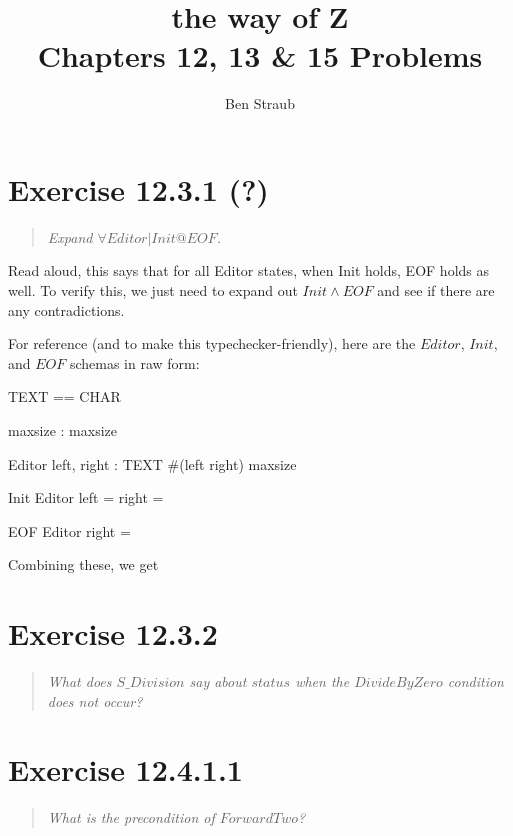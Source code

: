 \documentclass[10pt]{article}
\begin{document}
\title{the way of Z \\ Chapters 12, 13 \& 15 Problems}
\author{Ben Straub}
\maketitle

\section{Exercise 12.3.1 (?)}
\begin{quote}
  {\it
    Expand $\forall Editor | Init @ EOF$.
  }
\end{quote}
\tofinish{}
Read aloud, this says that for all Editor states, when Init holds, EOF holds as well. To verify
this, we just need to expand out $Init \land EOF$ and see if there are any contradictions.

For reference (and to make this typechecker-friendly), here are the $Editor$, $Init$, and $EOF$
schemas in raw form:
\begin{syntax}
  [CHAR] \also
  TEXT == \seq CHAR
\end{syntax}
\begin{axdef}
  maxsize : \nat
  \where
  maxsize 
\end{axdef}
\begin{schema}{Editor}
  left, right : TEXT
  \where
  \#(left \cat right) \leq maxsize
\end{schema}
\begin{schema}{Init}
  Editor
  \where
  left = right = \langle \rangle
\end{schema}
\begin{schema}{EOF}
  Editor
  \where
  right = \langle \rangle  
\end{schema}

Combining these, we get


\section{Exercise 12.3.2}
\begin{quote}
  {\it
    What does $S\_Division$ say about $status$ when the $DivideByZero$ condition does not occur?
  }
\end{quote}


\section{Exercise 12.4.1.1}
\begin{quote}
  {\it
   What is the precondition of $ForwardTwo$? 
  }
\end{quote}
\end{document}
